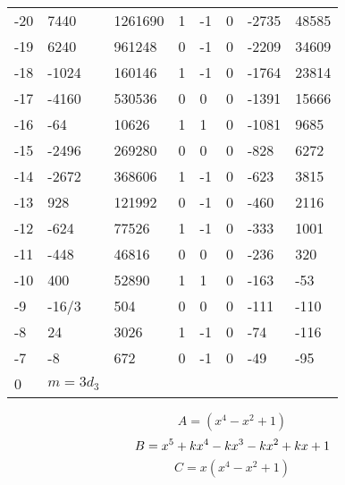 \documentclass{amsart}
\begin{document}
\begin{longtable}{|l|l|l|lllll|}
-20&7440&1261690&1&-1&0&-2735&48585\\
-19&6240&961248&0&-1&0&-2209&34609\\
-18&-1024&160146&1&-1&0&-1764&23814\\
-17&-4160&530536&0&0&0&-1391&15666\\
-16&-64&10626&1&1&0&-1081&9685\\
-15&-2496&269280&0&0&0&-828&6272\\
-14&-2672&368606&1&-1&0&-623&3815\\
-13&928&121992&0&-1&0&-460&2116\\
-12&-624&77526&1&-1&0&-333&1001\\
-11&-448&46816&0&0&0&-236&320\\
-10&400&52890&1&1&0&-163&-53\\
-9&-16/3&504&0&0&0&-111&-110\\
-8&24&3026&1&-1&0&-74&-116\\
-7&-8&672&0&-1&0&-49&-95\\
0&$m=3d_{3}$&&\multicolumn{5}{c|}{}\\
\hline
\end{longtable}
$$A=(x^4
 - x^2
 + 1)$$
$$B=x^5
 + k\*x^4
 - k\*x^3
 - k\*x^2
 + k\*x
 + 1$$
$$C=x(x^4
 - x^2
 + 1)$$
\end{document}
